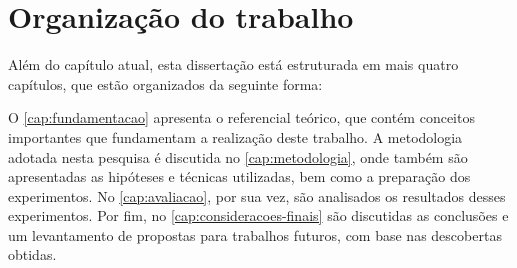 \section{Organização do trabalho}
\label{sec:introducao-organizacao-trabalho}

Além do capítulo atual, esta dissertação está estruturada em mais quatro capítulos, que estão organizados da seguinte forma:

O \autoref{cap:fundamentacao} apresenta o referencial teórico, que contém conceitos importantes que fundamentam a realização deste trabalho.
A metodologia adotada nesta pesquisa é discutida no \autoref{cap:metodologia}, onde também são apresentadas as hipóteses e técnicas utilizadas, bem como a preparação dos experimentos.
No \autoref{cap:avaliacao}, por sua vez, são analisados os resultados desses experimentos.
Por fim, no \autoref{cap:consideracoes-finais} são discutidas as conclusões e um levantamento de propostas para trabalhos futuros, com base nas descobertas obtidas.
